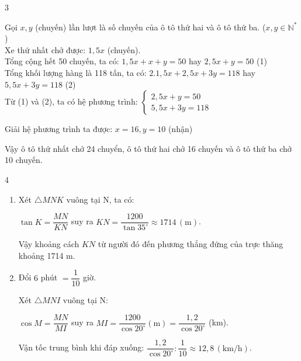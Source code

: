 \begin{Solbook}{3}
 \par \noindent Gọi $x,y$ (chuyến) lần lượt là số chuyến của ô tô thứ hai và ô tô thứ ba. ($x,y \in \mathbb {N}^*$) \\ Xe thứ nhất chở được: $1{,}5x$ (chuyến). \\ Tổng cộng hết 50 chuyến, ta có: $1{,}5x + x + y = 50$ hay $2,5x+y=50$ \quad (1) \\ Tổng khối lượng hàng là 118 tấn, ta có: $2. 1{,}5x + 2{,}5x + 3y = 118$ hay $5,5x+3y=118$ \quad (2) \\ Từ (1) và (2), ta có hệ phương trình: $\begin {cases} 2{,}5x + y = 50 \\ 5{,}5x + 3y = 118 \end {cases}$ \par Giải hệ phương trình ta được: $x=16, y=10$ (nhận) \par Vậy ô tô thứ nhất chở 24 chuyển, ô tô thứ hai chở 16 chuyến và ô tô thứ ba chở 10 chuyến. \hfill \qedEX 
\end{Solbook}
\begin{Solbook}{4}
 \par \noindent  \begin {enumerate} \item Xét $\triangle MNK$ vuông tại N, ta có: \par $\tan K = \dfrac {MN}{KN}$ suy ra $KN = \dfrac {1200}{\tan 35^\circ } \approx 1714\, (\text {m})$. \par Vậy khoảng cách $KN$ từ người đó đến phương thẳng đứng của trực thăng khoảng 1714 m. \par \item Đổi $6$ phút $= \dfrac {1}{10}$ giờ. \par Xét $\triangle MNI$ vuông tại N: \par $\cos M = \dfrac {MN}{MI}$ suy ra $MI = \dfrac {1200}{\cos 20^\circ } (\text {m})=\dfrac {1,2}{\cos 20^\circ }$ (km). \par Vận tốc trung bình khi đáp xuống: $\dfrac {1,2}{\cos 20^\circ }: \dfrac {1}{10} \approx 12{,}8\, (\text {km/h})$. \end {enumerate} \hfill \qedEX 
\end{Solbook}
